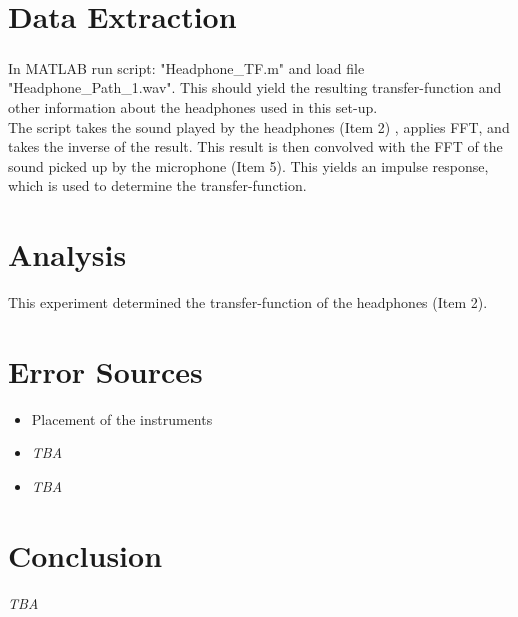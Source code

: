 \documentclass[12pt,a4paper,openright]{article}
\begin{document}
\section{Data Extraction}
In MATLAB\textsuperscript{\textregistered} run script: "Headphone\_TF.m" and load file "Headphone\_Path\_1.wav". This should yield the resulting transfer-function and other information about the headphones used in this set-up.\\
\indent The script takes the sound played by the headphones (Item 2) , applies FFT, and takes the inverse of the result. This result is then convolved with the FFT of the sound picked up by the microphone (Item 5). This yields an impulse response, which is used to determine the transfer-function.

\section{Analysis}
This experiment determined the transfer-function of the headphones (Item 2).

\section{Error Sources}
\begin{itemize}
	\item Placement of the instruments
	\item \textit{TBA}
	\item \textit{TBA}
\end{itemize}

\section{Conclusion}
\textit{TBA}
\end{document}
